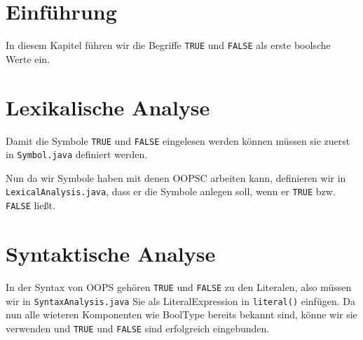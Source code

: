 \section{Einführung}
In diesem Kapitel führen wir die Begriffe \verb|TRUE| und \verb|FALSE| als erste boolsche Werte ein.\\

\section{Lexikalische Analyse}
Damit die Symbole  \verb|TRUE| und \verb|FALSE|  eingelesen werden können müssen sie zuerst in  \verb|Symbol.java| definiert werden.

Nun da wir Symbole haben mit denen OOPSC arbeiten kann, definieren wir in \verb|LexicalAnalysis.java|, dass er die Symbole anlegen soll, wenn er \verb|TRUE| bzw. \verb|FALSE| ließt.


\section{Syntaktische Analyse}
In der Syntax von OOPS gehören  \verb|TRUE| und \verb|FALSE| zu den Literalen, also müssen wir in \verb|SyntaxAnalysis.java| Sie als LiteralExpression in \verb|literal()| einfügen. Da nun alle wieteren Komponenten wie BoolType bereits bekannt sind, könne wir sie verwenden und  \verb|TRUE| und \verb|FALSE| sind erfolgreich eingebunden.

